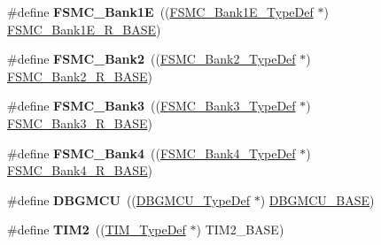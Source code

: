 \begin{DoxyCompactItemize}
\item 
\hypertarget{group___peripheral__declaration_ga422986101f42a8811ae89ac69deb2759}{\#define {\bfseries F\-S\-M\-C\-\_\-\-Bank1\-E}~((\hyperlink{struct_f_s_m_c___bank1_e___type_def}{F\-S\-M\-C\-\_\-\-Bank1\-E\-\_\-\-Type\-Def} $\ast$) \hyperlink{group___peripheral__memory__map_gaea182589c84aee30b7f735474d8774e2}{F\-S\-M\-C\-\_\-\-Bank1\-E\-\_\-\-R\-\_\-\-B\-A\-S\-E})}\label{group___peripheral__declaration_ga422986101f42a8811ae89ac69deb2759}

\item 
\hypertarget{group___peripheral__declaration_gabb3dfb5e88694aa2983ecabd33a55e0a}{\#define {\bfseries F\-S\-M\-C\-\_\-\-Bank2}~((\hyperlink{struct_f_s_m_c___bank2___type_def}{F\-S\-M\-C\-\_\-\-Bank2\-\_\-\-Type\-Def} $\ast$) \hyperlink{group___peripheral__memory__map_ga3cb46d62f4f6458e186a5a4c753e4918}{F\-S\-M\-C\-\_\-\-Bank2\-\_\-\-R\-\_\-\-B\-A\-S\-E})}\label{group___peripheral__declaration_gabb3dfb5e88694aa2983ecabd33a55e0a}

\item 
\hypertarget{group___peripheral__declaration_ga411eedc00b5b2b22b494004d4f41b736}{\#define {\bfseries F\-S\-M\-C\-\_\-\-Bank3}~((\hyperlink{struct_f_s_m_c___bank3___type_def}{F\-S\-M\-C\-\_\-\-Bank3\-\_\-\-Type\-Def} $\ast$) \hyperlink{group___peripheral__memory__map_gacf056152c9e5aefcc67db78d1302c0d7}{F\-S\-M\-C\-\_\-\-Bank3\-\_\-\-R\-\_\-\-B\-A\-S\-E})}\label{group___peripheral__declaration_ga411eedc00b5b2b22b494004d4f41b736}

\item 
\hypertarget{group___peripheral__declaration_ga5aa00e4ac522693c6a21bc23ef5a96df}{\#define {\bfseries F\-S\-M\-C\-\_\-\-Bank4}~((\hyperlink{struct_f_s_m_c___bank4___type_def}{F\-S\-M\-C\-\_\-\-Bank4\-\_\-\-Type\-Def} $\ast$) \hyperlink{group___peripheral__memory__map_gaf9e5417133160b0bdd0498d982acec19}{F\-S\-M\-C\-\_\-\-Bank4\-\_\-\-R\-\_\-\-B\-A\-S\-E})}\label{group___peripheral__declaration_ga5aa00e4ac522693c6a21bc23ef5a96df}

\item 
\hypertarget{group___peripheral__declaration_ga92ec6d9ec2251fda7d4ce09748cd74b4}{\#define {\bfseries D\-B\-G\-M\-C\-U}~((\hyperlink{struct_d_b_g_m_c_u___type_def}{D\-B\-G\-M\-C\-U\-\_\-\-Type\-Def} $\ast$) \hyperlink{group___peripheral__memory__map_ga4adaf4fd82ccc3a538f1f27a70cdbbef}{D\-B\-G\-M\-C\-U\-\_\-\-B\-A\-S\-E})}\label{group___peripheral__declaration_ga92ec6d9ec2251fda7d4ce09748cd74b4}

\item 
\hypertarget{group___peripheral__declaration_ga3cfac9f2e43673f790f8668d48b4b92b}{\#define {\bfseries T\-I\-M2}~((\hyperlink{struct_t_i_m___type_def}{T\-I\-M\-\_\-\-Type\-Def} $\ast$) T\-I\-M2\-\_\-\-B\-A\-S\-E)}\label{group___peripheral__declaration_ga3cfac9f2e43673f790f8668d48b4b92b}


\end{DoxyCompactItemize}
